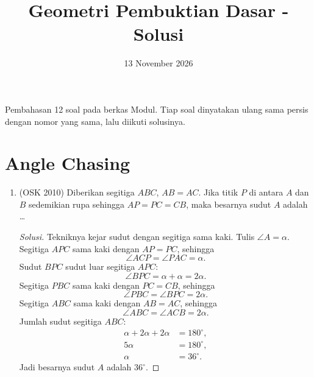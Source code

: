 \documentclass[12pt]{scrartcl}
\title{Geometri Pembuktian Dasar - Solusi}
\date{13 November 2026}
\begin{document}
\maketitle

\renewcommand*\contentsname{Daftar Isi}
\tableofcontents

\newpage

Pembahasan 12 soal pada berkas Modul. Tiap soal dinyatakan ulang sama
persis dengan nomor yang sama, lalu diikuti solusinya.

\section{Angle Chasing}

\begin{enumerate}

	\item (OSK 2010)
	Diberikan segitiga $ABC$, $AB=AC$. Jika titik $P$ di antara $A$ dan
	$B$ sedemikian rupa sehingga $AP=PC=CB$, maka besarnya sudut $A$
	adalah \dots
\begin{center}
\end{center}
	\begin{proof}[Solusi]
	Tekniknya kejar sudut dengan segitiga sama kaki. Tulis
	$\angle A = \alpha$.
	Segitiga $APC$ sama kaki dengan $AP = PC$, sehingga
	\[ \angle ACP = \angle PAC = \alpha. \]
	Sudut $BPC$ sudut luar segitiga $APC$:
	\[ \angle BPC = \alpha + \alpha = 2\alpha. \]
	Segitiga $PBC$ sama kaki dengan $PC = CB$, sehingga
	\[ \angle PBC = \angle BPC = 2\alpha. \]
	Segitiga $ABC$ sama kaki dengan $AB = AC$, sehingga
	\[ \angle ABC = \angle ACB = 2\alpha. \]
	Jumlah sudut segitiga $ABC$:
	\begin{align*}
	\alpha + 2\alpha + 2\alpha &= 180^\circ, \\
	5\alpha &= 180^\circ, \\
	\alpha &= 36^\circ.
	\end{align*}
	Jadi besarnya sudut $A$ adalah $36^\circ$.
	\end{proof}


\end{enumerate}
\end{document}
